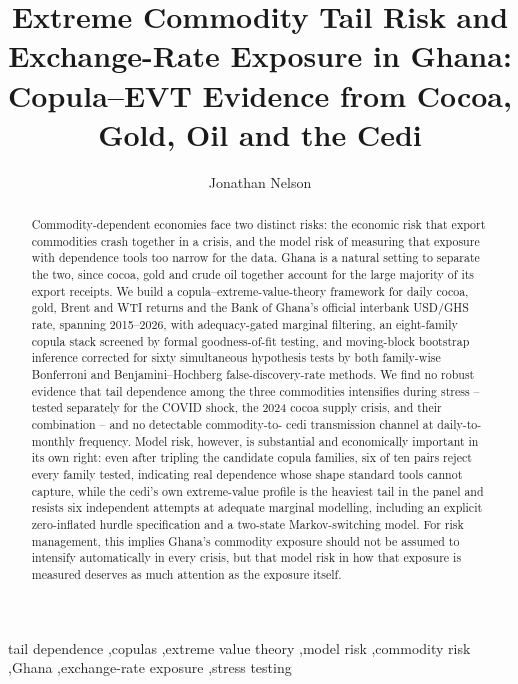 \documentclass[final,3p,times,authoryear]{elsarticle}
\begin{document}
\begin{frontmatter}

\title{Extreme Commodity Tail Risk and Exchange-Rate Exposure in Ghana:
Copula--EVT Evidence from Cocoa, Gold, Oil and the Cedi}

\author{Jonathan Nelson}
\address{Independent Research Project}

\begin{abstract}
Commodity-dependent economies face two distinct risks: the economic risk
that export commodities crash together in a crisis, and the model risk
of measuring that exposure with dependence tools too narrow for the
data. Ghana is a natural setting to separate the two, since cocoa, gold
and crude oil together account for the large majority of its export
receipts. We build a copula--extreme-value-theory framework for daily
cocoa, gold, Brent and WTI returns and the Bank of Ghana's official
interbank USD/GHS rate, spanning 2015--2026, with adequacy-gated
marginal filtering, an eight-family copula stack screened by formal
goodness-of-fit testing, and moving-block bootstrap inference corrected
for sixty simultaneous hypothesis tests by both family-wise Bonferroni
and Benjamini--Hochberg false-discovery-rate methods. We find no robust
evidence that tail dependence among the three commodities intensifies
during stress -- tested separately for the COVID shock, the 2024 cocoa
supply crisis, and their combination -- and no detectable commodity-to-
cedi transmission channel at daily-to-monthly frequency. Model risk,
however, is substantial and economically important in its own right:
even after tripling the candidate copula families, six of ten pairs
reject every family tested, indicating real dependence whose shape
standard tools cannot capture, while the cedi's own extreme-value
profile is the heaviest tail in the panel and resists six independent
attempts at adequate marginal modelling, including an explicit
zero-inflated hurdle specification and a two-state Markov-switching
model. For risk management, this implies Ghana's commodity exposure
should not be assumed to intensify automatically in every crisis, but
that model risk in how that exposure is measured deserves as much
attention as the exposure itself.
\end{abstract}

\begin{keyword}
tail dependence \sep copulas \sep extreme value theory \sep model risk
\sep commodity risk \sep Ghana \sep exchange-rate exposure \sep stress
testing
\end{keyword}

\end{frontmatter}
\end{document}
